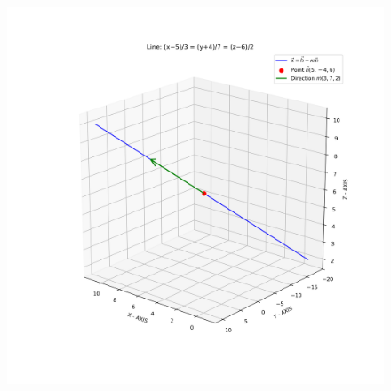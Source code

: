 \documentclass[journal]{IEEEtran}
\begin{document}
\begin{figure}[h!]
    \centering
    \includegraphics[width=1.0\linewidth]{figs/fig.png}
    \caption{}
    \label{fig:line3D}
\end{figure}
\end{document}
